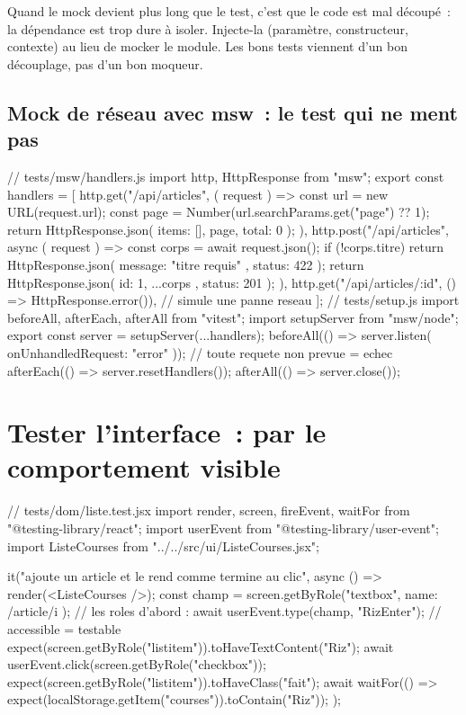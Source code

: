 \begin{astuce}
Quand le mock devient plus long que le test, c'est que le code est mal d\'ecoup\'e~: la d\'ependance
est trop dure \`a isoler. Injecte-la (param\`etre, constructeur, contexte) au lieu de mocker le
module. Les bons tests viennent d'un bon d\'ecouplage, pas d'un bon moqueur.
\end{astuce}

\subsection{Mock de r\'eseau avec msw~: le test qui ne ment pas}

\begin{codejs}
// tests/msw/handlers.js
import { http, HttpResponse } from "msw";
export const handlers = [
  http.get("/api/articles", ({ request }) => {
    const url = new URL(request.url);
    const page = Number(url.searchParams.get("page") ?? 1);
    return HttpResponse.json({ items: [], page, total: 0 });
  }),
  http.post("/api/articles", async ({ request }) => {
    const corps = await request.json();
    if (!corps.titre) return HttpResponse.json({ message: "titre requis" }, { status: 422 });
    return HttpResponse.json({ id: 1, ...corps }, { status: 201 });
  }),
  http.get("/api/articles/:id", () => HttpResponse.error()),        // simule une panne reseau
];
// tests/setup.js
import { beforeAll, afterEach, afterAll } from "vitest";
import { setupServer } from "msw/node";
export const server = setupServer(...handlers);
beforeAll(() => server.listen({ onUnhandledRequest: "error" }));   // toute requete non prevue = echec
afterEach(() => server.resetHandlers());
afterAll(() => server.close());
\end{codejs}

\section{Tester l'interface~: par le comportement visible}

\begin{codejs}
// tests/dom/liste.test.jsx
import { render, screen, fireEvent, waitFor } from "@testing-library/react";
import userEvent from "@testing-library/user-event";
import { ListeCourses } from "../../src/ui/ListeCourses.jsx";

it("ajoute un article et le rend comme termine au clic", async () => {
  render(<ListeCourses />);
  const champ = screen.getByRole("textbox", { name: /article/i });     // les roles d'abord :
  await userEvent.type(champ, "Riz{Enter}");                            //  accessible = testable
  expect(screen.getByRole("listitem")).toHaveTextContent("Riz");
  await userEvent.click(screen.getByRole("checkbox"));
  expect(screen.getByRole("listitem")).toHaveClass("fait");
  await waitFor(() => expect(localStorage.getItem("courses")).toContain("Riz"));
});
\end{codejs}

